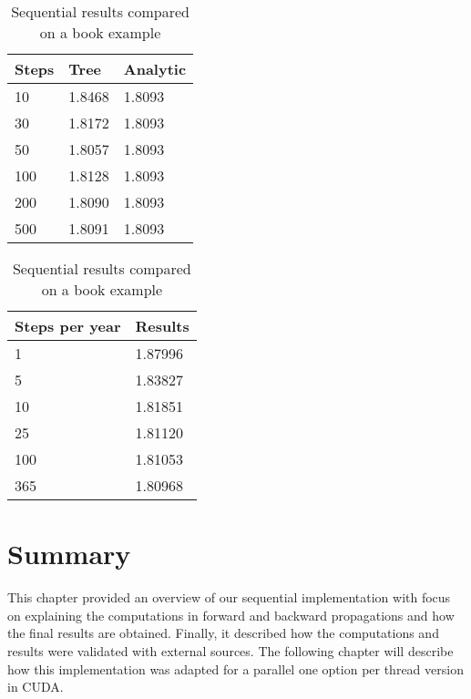 \begin{table}[h]
\centering
\caption{Sequential results compared on a book example}
\label{table:book-results}
\begin{tabular}{|lll|}
\hline
Steps & Tree   & Analytic \\ \hline
10    & 1.8468 & 1.8093   \\
30    & 1.8172 & 1.8093   \\
50    & 1.8057 & 1.8093   \\
100   & 1.8128 & 1.8093   \\
200   & 1.8090 & 1.8093   \\
500   & 1.8091 & 1.8093   \\ \hline
\end{tabular}
\begin{tabular}{|ll|}
\hline
Steps per year & Results \\ \hline
1              & 1.87996 \\
5              & 1.83827 \\
10             & 1.81851 \\
25             & 1.81120 \\
100            & 1.81053 \\
365            & 1.80968 \\ \hline
\end{tabular}
\end{table}

\newpage
\section*{Summary}
This chapter provided an overview of our sequential implementation with focus on explaining  the computations in forward and backward propagations and how the final results are obtained. Finally, it described how the computations and results were validated with external sources. 
The following chapter will describe how this implementation was adapted for a parallel one option per thread version in CUDA.
